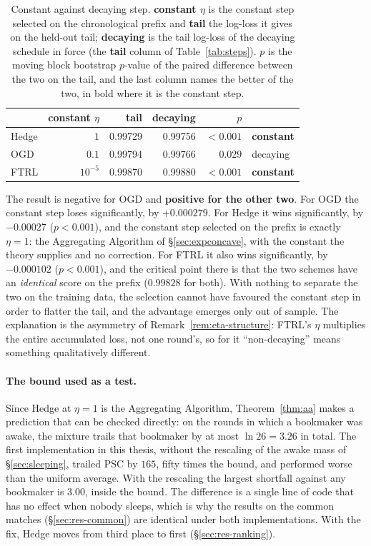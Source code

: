 \documentclass[12pt,a4paper,oneside]{report}
\renewcommand{\_}{\oldunderscore\allowbreak}
\theoremstyle{definition}
\theoremstyle{plain}
\theoremstyle{definition}   %
\begin{document}
\begin{table}[H]
\centering
\begin{tabular}{@{}lrrrrl@{}}
\toprule
& \textbf{constant $\eta$} & \textbf{tail} & \textbf{decaying} & \textbf{$p$} & \\
\midrule
Hedge & $1$             & 0.99729 & 0.99756 & $<0.001$ & \textbf{constant} \\
OGD   & $0.1$           & 0.99794 & 0.99766 & $0.029$  & decaying \\
FTRL  & $10^{-5}$       & 0.99870 & 0.99880 & $<0.001$ & \textbf{constant} \\
\bottomrule
\end{tabular}
\caption{Constant against decaying step. \textbf{constant $\eta$} is the constant step selected
on the chronological prefix and \textbf{tail} the log-loss it gives on the held-out tail;
\textbf{decaying} is the tail log-loss of the decaying schedule in force (the \textbf{tail}
column of Table~\ref{tab:steps}). $p$ is the moving block bootstrap $p$-value of the paired
difference between the two on the tail, and the last column names the better of the two, in
bold where it is the constant step.}
\label{tab:const-step}
\end{table}

The result is negative for OGD and \textbf{positive for the other two}. For OGD the constant
step loses significantly, by $+0.000279$. For Hedge it wins significantly, by $-0.00027$
($p<0.001$), and the constant step selected on the prefix is exactly $\eta=1$: the Aggregating
Algorithm of \S\ref{sec:expconcave}, with the constant the theory supplies and no correction.
For FTRL it also wins significantly, by $-0.000102$ ($p<0.001$), and the critical point there is
that the two schemes have an \emph{identical} score on the prefix ($0.99828$ for both). With nothing to
separate the two on the training data, the selection cannot have favoured the constant step in
order to flatter the tail, and the advantage emerges only out of sample. The explanation is the
asymmetry of Remark~\ref{rem:eta-structure}: FTRL's $\eta$ multiplies the entire accumulated
loss, not one round's, so for it ``non-decaying'' means something qualitatively different.

\paragraph{The bound used as a test.} Since Hedge at $\eta=1$ is the Aggregating Algorithm,
Theorem~\ref{thm:aa} makes a prediction that can be checked directly: on the rounds in which a
bookmaker was awake, the mixture trails that bookmaker by at most $\ln 26 = 3.26$ in total. The
first implementation in this thesis, without the rescaling of the awake mass of
\S\ref{sec:sleeping}, trailed PSC by $165$, fifty times the bound, and performed worse than the
uniform average. With the rescaling the largest shortfall against any bookmaker is $3.00$, inside
the bound. The difference is a single line of code that has no effect when nobody sleeps, which
is why the results on the common matches (\S\ref{sec:res-common}) are identical under both
implementations. With the fix, Hedge moves from third place to first
(\S\ref{sec:res-ranking}).
\end{document}
